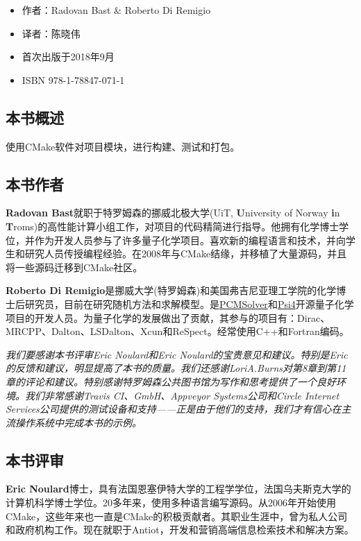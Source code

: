 \begin{itemize}
\item 作者：Radovan Bast \& Roberto Di Remigio

\item 译者：陈晓伟

\item 首次出版于2018年9月

\item ISBN 978-1-78847-071-1

\end{itemize}

\subsection{本书概述}

使用CMake软件对项目模块，进行构建、测试和打包。

\subsection{本书作者}

\textbf{Radovan Bast}就职于特罗姆森的挪威北极大学(UiT, \textbf{U}niversity of Norway \textbf{i}n \textbf{T}roms)的高性能计算小组工作，对项目的代码精简进行指导。他拥有化学博士学位，并作为开发人员参与了许多量子化学项目。喜欢新的编程语言和技术，并向学生和研究人员传授编程经验。在2008年与CMake结缘，并移植了大量源码，并且将一些源码迁移到CMake社区。

\textbf{Roberto Di Remigio}是挪威大学(特罗姆森)和美国弗吉尼亚理工学院的化学博士后研究员，目前在研究随机方法和求解模型。是\href{https://github.com/PCMSolver/pcmsolver}{PCMSolver}和\href{https://github.com/psi4}{Psi4}开源量子化学项目的开发人员。为量子化学的发展做出了贡献，其参与的项目有：Dirac、MRCPP、Dalton、LSDalton、Xcun和ReSpect。经常使用C++和Fortran编码。

\emph{我们要感谢本书评审Eric Noulard和Eric Noulard的宝贵意见和建议。特别是Eric的反馈和建议，明显提高了本书的质量。我们还感谢LoriA.Burns对第8章到第11章的评论和建议。特别感谢特罗姆森公共图书馆为写作和思考提供了一个良好环境。我们非常感谢Travis CI、GmbH、Appveyor Systems公司和Circle Internet Services公司提供的测试设备和支持——正是由于他们的支持，我们才有信心在主流操作系统中完成本书的示例。}

\subsection{本书评审}

\textbf{Eric Noulard}博士，具有法国恩塞伊特大学的工程学学位，法国乌夫斯克大学的计算机科学博士学位。20多年来，使用多种语言编写源码。从2006年开始使用CMake，这些年来也一直是CMake的积极贡献者。其职业生涯中，曾为私人公司和政府机构工作。现在就职于Antiot，开发和营销高端信息检索技术和解决方案。

